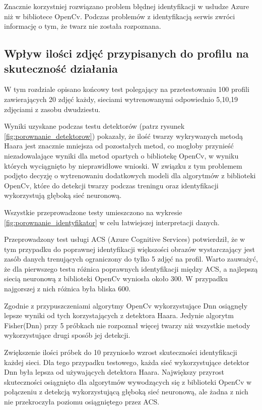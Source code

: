 Znacznie korzystniej rozwiązano problem błędnej identyfikacji w usłudze Azure niż w bibliotece OpenCv. Podczas problemów z identyfikacją serwis zwróci informację o tym, że twarz nie została rozpoznana.

\subsection{Wpływ ilości zdjęć przypisanych do profilu na skuteczność działania}
W tym rozdziale opisano końcowy test polegający na przetestowaniu 100 profili zawierających 20 zdjęć każdy, sieciami wytrenowanymi odpowiednio 5,10,19 zdjęciami z zasobu dwudziestu.

Wyniki uzyskane podczas testu detektorów (patrz rysunek \ref{fig:porownanie_detektorow}) pokazały, że ilość twarzy wykrywanych metodą Haara jest znacznie mniejsza od pozostałych metod, co mogłoby przynieść niezadowalające wyniki dla metod opartych o bibliotekę OpenCv, w wyniku których wyciągnięto by nieprawidłowe wnioski. W związku z tym problemem podjęto decyzję o wytrenowaniu dodatkowych modeli dla algorytmów z biblioteki OpenCv, które do detekcji twarzy podczas treningu oraz identyfikacji wykorzystują głęboką sieć neuronową.

Wszystkie przeprowadzone testy umieszczono na wykresie \ref{fig:porownanie_identyfikator} w celu łatwiejszej interpretacji danych.

Przeprowadzony test usługi ACS (Azure Cognitive Services) potwierdził, że w tym przypadku do poprawnej identyfikacji większości obrazów wystarczający jest zasób danych trenujących ograniczony do tylko 5 zdjęć na profil. Warto zauważyć, że dla pierwszego testu różnica poprawnych identyfikacji między ACS, a najlepszą siecią neuronową z biblioteki OpenCv wyniosła około 300. W przypadku najgorszej z nich różnica była bliska 600.

Zgodnie z przypuszczeniami algorytmy OpenCv wykorzystujące Dnn osiągnęły lepsze wyniki od tych korzystających z detektora Haara. Jedynie algorytm Fisher(Dnn) przy 5 próbkach nie rozpoznał więcej twarzy niż wszystkie metody wykorzystujące drugi sposób jej detekcji.

Zwiększenie ilości próbek do 10 przyniosło wzrost skuteczności identyfikacji każdej sieci. Dla tego przypadku testowego, każda sieć wykorzystujące detektor Dnn była lepsza od używających detektora Haara. Największy przyrost skuteczności osiągnięto dla algorytmów wywodzących się z biblioteki OpenCv w połączeniu z detekcją wykorzystującą głęboką sieć neuronową, ale żadna z nich nie przekroczyła poziomu osiągniętego przez ACS.


